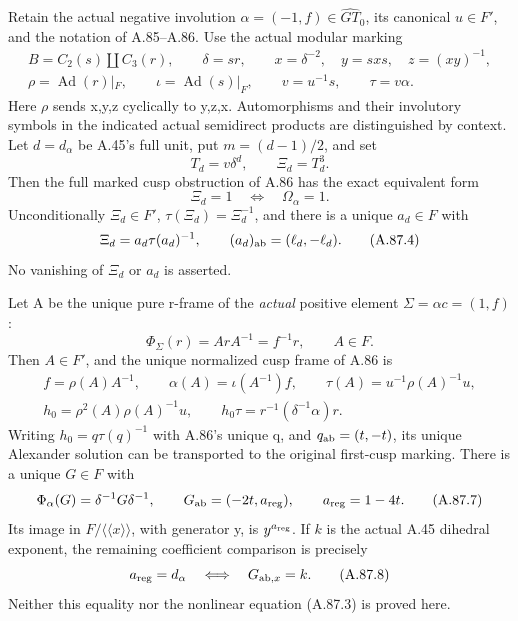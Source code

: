 Retain the actual negative involution \(\alpha=(-1,f)\in\widehat{GT}_0\),
its canonical \(u\in F'\), and the notation of A.85--A.86.
Use the actual modular marking
\[
 \begin{gathered}
 B=C_2(s)\amalg C_3(r),\qquad \delta=sr,\qquad
 x=\delta^{-2},\quad y=sxs,\quad z=(xy)^{-1},\\
 \rho=\operatorname{Ad}(r)|_F,\qquad
 \iota=\operatorname{Ad}(s)|_F,\qquad
 v=u^{-1}s,\qquad \tau=v\alpha.
 \end{gathered}
 \tag{A.87.1}
\]
Here \(\rho\) sends x,y,z cyclically to y,z,x. Automorphisms and
their involutory symbols in the indicated actual semidirect products
are distinguished by context. Let \(d=d_\alpha\) be A.45's full unit,
put \(m=(d-1)/2\), and set
\[
 T_d=v\delta^d,\qquad \Xi_d=T_d^3.
 \tag{A.87.2}
\]
Then the full marked cusp obstruction of A.86 has the exact equivalent
form
\[
                 \Xi_d=1\quad\Longleftrightarrow\quad\Omega_\alpha=1.
 \tag{A.87.3}
\]
Unconditionally \(\Xi_d\in F'\), \(\tau(\Xi_d)=\Xi_d^{-1}\), and
there is a unique \(a_d\in F\) with
\[
 \Xi_d=a_d\tau(a_d)^{-1},\qquad
 (a_d)_{\rm ab}=(\ell_d,-\ell_d).
 \tag{A.87.4}
\]
No vanishing of \(\Xi_d\) or \(a_d\) is asserted.

Let A be the unique pure r-frame of the \emph{actual} positive element
\(\Sigma=\alpha c=(1,f)\):
\[
 \Phi_\Sigma(r)=ArA^{-1}=f^{-1}r,\qquad A\in F.
 \tag{A.87.5}
\]
Then \(A\in F'\), and the unique normalized cusp frame of A.86 is
\[
 \begin{gathered}
 f=\rho(A)A^{-1},\qquad
 \alpha(A)=\iota(A^{-1})f,\qquad
 \tau(A)=u^{-1}\rho(A)^{-1}u,\\
 h_0=\rho^2(A)\rho(A)^{-1}u,\qquad
 h_0\tau=r^{-1}(\delta^{-1}\alpha)r.
 \end{gathered}
 \tag{A.87.6}
\]
Writing \(h_0=q\tau(q)^{-1}\) with A.86's unique q, and
\(q_{\rm ab}=(t,-t)\), its unique Alexander solution can be transported
to the original first-cusp marking. There is a unique \(G\in F\) with
\[
 \Phi_\alpha(G)=\delta^{-1}G\delta^{-1},\qquad
 G_{\rm ab}=(-2t,a_{\rm reg}),\qquad a_{\rm reg}=1-4t.
 \tag{A.87.7}
\]
Its image in \(F/\langle\!\langle x\rangle\!\rangle\), with generator y,
is \(y^{a_{\rm reg}}\). If \(k\) is the actual A.45 dihedral exponent,
the remaining coefficient comparison is precisely
\[
             a_{\rm reg}=d_\alpha
             \quad\Longleftrightarrow\quad G_{{\rm ab},x}=k.
 \tag{A.87.8}
\]
Neither this equality nor the nonlinear equation (A.87.3) is proved here.

